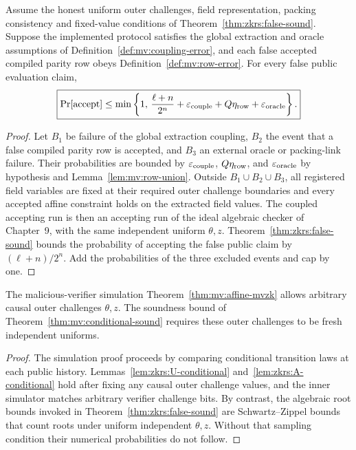 \begin{theorem}\label{thm:mv:conditional-sound}
Assume the honest uniform outer
challenges, field representation,
packing consistency and fixed-value
conditions of
Theorem~\ref{thm:zkrs:false-sound}.
Suppose the implemented protocol
satisfies the global extraction
and oracle assumptions of
Definition~\ref{def:mv:coupling-error},
and each false accepted compiled
parity row obeys
Definition~\ref{def:mv:row-error}.
For every false public evaluation
claim,
\[
 \boxed{
 \Pr[\mathrm{accept}]
 \leq\min\left\{1,\,
 \frac{\ell+n}{2^n}
 +\varepsilon_{\rm couple}
 +Q\eta_{\rm row}
 +\varepsilon_{\rm oracle}
 \right\}.}
\]
\end{theorem}
\begin{proof}
Let $B_1$ be failure of the
global extraction coupling,
$B_2$ the event that a false
compiled parity row is accepted,
and $B_3$ an external oracle or
packing-link failure. Their
probabilities are bounded by
$\varepsilon_{\rm couple}$,
$Q\eta_{\rm row}$, and
$\varepsilon_{\rm oracle}$
by hypothesis and
Lemma~\ref{lem:mv:row-union}.
Outside $B_1\cup B_2\cup B_3$,
all registered field variables
are fixed at their required
outer challenge boundaries
and every accepted affine
constraint holds on the
extracted field values.
The coupled accepting run is
then an accepting run of the
ideal algebraic checker of
Chapter~9, with the same
independent uniform
$\theta,z$.
Theorem~\ref{thm:zkrs:false-sound}
bounds the probability of
accepting the false public claim
by $(\ell+n)/2^n$.
Add the probabilities of the
three excluded events and
cap by one.
\end{proof}

\begin{lemma}\label{lem:mv:outer-adaptive}
The malicious-verifier simulation
Theorem~\ref{thm:mv:affine-mvzk}
allows arbitrary causal outer
challenges $\theta,z$.
The soundness bound of
Theorem~\ref{thm:mv:conditional-sound}
requires these outer challenges
to be fresh independent uniforms.
\end{lemma}
\begin{proof}
The simulation proof proceeds by
comparing conditional transition
laws at each public history.
Lemmas~\ref{lem:zkrs:U-conditional}
and~\ref{lem:zkrs:A-conditional}
hold after fixing any causal
outer challenge values, and
the inner simulator matches
arbitrary verifier challenge bits.
By contrast, the algebraic
root bounds invoked in
Theorem~\ref{thm:zkrs:false-sound}
are Schwartz--Zippel bounds
that count roots under uniform
independent $\theta,z$.
Without that sampling condition
their numerical probabilities
do not follow.
\end{proof}

